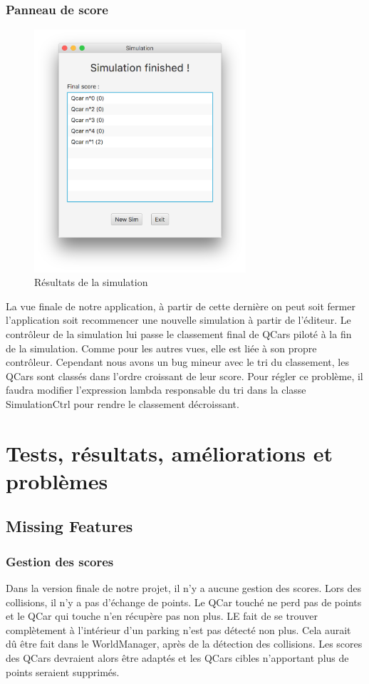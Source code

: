 \documentclass[a4paper, 12pt]{article}
\begin{document}
\subsubsection{Panneau de score}
\begin{figure}[H]
 \centering
 \includegraphics[width=0.7\textwidth]{includes/images/endscreen}
 \caption{\label{fig:scoreboard}Résultats de la simulation}
\end{figure}
La vue finale de notre application, à partir de cette dernière on peut soit fermer l'application soit recommencer une nouvelle simulation à partir de l'éditeur. Le contrôleur de la simulation lui passe le classement final de QCars piloté à la fin de la simulation. Comme pour les autres vues, elle est liée à son propre contrôleur.
Cependant nous avons un bug mineur avec le tri du classement, les QCars sont classés dans l'ordre croissant de leur score. Pour régler ce problème, il faudra modifier l'expression lambda responsable du tri dans la classe SimulationCtrl pour rendre le classement décroissant.
\section{Tests, résultats, améliorations et problèmes}
\subsection{Missing Features}
\subsubsection{Gestion des scores}
Dans la version finale de notre projet, il n'y a aucune gestion des scores. Lors des collisions, il n'y a pas d'échange de points. Le QCar touché ne perd pas de points et le QCar qui touche n'en récupère pas non plus. LE fait de se trouver complètement à l'intérieur d'un parking n'est pas détecté non plus. Cela aurait dû être fait dans le WorldManager, après de la détection des collisions. Les scores des QCars devraient alors être adaptés et les QCars cibles n'apportant plus de points seraient supprimés.
\end{document}
